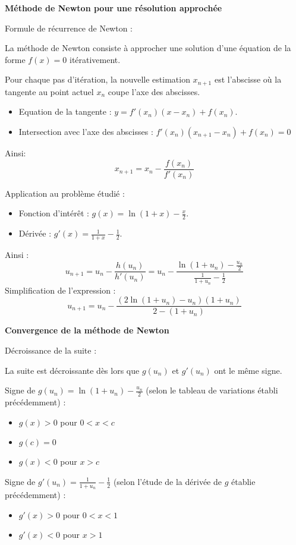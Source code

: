 \documentclass[10pt,a4paper]{article}
\begin{document}
\bigskip
\textbf{Méthode de Newton pour une résolution approchée}

\q Formule de récurrence de Newton :

La méthode de Newton consiste à approcher une solution d'une équation de la forme \( f(x) = 0 \) itérativement.

Pour chaque pas d'itération, la nouvelle estimation $x_{n+1}$ est l'abscisse où la tangente au point
actuel \( x_n \) coupe l'axe des abscisses.
\begin{itemize}
    \item Equation de la tangente : \( y = f'(x_n)(x - x_n) + f(x_n) \).
    \item Intersection avec l'axe des abscisses : \( f'(x_n)(x_{n+1} - x_n) + f(x_n) = 0 \)
\end{itemize}
Ainsi:
\[
x_{n+1} = x_n - \frac{f(x_n)}{f'(x_n)}
\]


\q Application au problème étudié :
\begin{itemize}
    \item Fonction d'intérêt : \( g(x) = \ln(1+x) - \frac{x}{2} \).
    \item Dérivée : \( g'(x) = \frac{1}{1+x} - \frac{1}{2} \).
\end{itemize}
Ainsi :
\[
 u_{n+1} = u_n - \frac{h(u_n)}{h'(u_n)} = u_n - \frac{\ln(1+u_n) - \frac{u_n}{2}}{\frac{1}{1+u_n} - \frac{1}{2}}
\]
Simplification de l'expression :
\[
 u_{n+1} = u_n - \frac{(2\ln(1+u_n) - u_n)(1+u_n)}{2 - (1+u_n)}
\]


\bigskip
\textbf{Convergence de la méthode de Newton}

\q Décroissance de la suite :

La suite est décroissante dès lors que \( g(u_n) \) et \( g'(u_n) \) ont le même signe.

Signe de \( g(u_n) = \ln(1+u_n) - \frac{u_n}{2} \) (selon le tableau de variations établi
précédemment) :
\begin{itemize}
    \item \( g(x) > 0 \) pour \( 0 < x < c \)
    \item \( g(c) = 0 \)
    \item \( g(x) < 0 \) pour \( x > c \)
\end{itemize}

Signe de \( g'(u_n) = \frac{1}{1+u_n} - \frac{1}{2} \) (selon l'étude de la dérivée de \( g \)
établie précédemment) :
\begin{itemize}
    \item \( g'(x) > 0 \) pour \( 0 < x < 1 \)
    \item \( g'(x) < 0 \) pour \( x > 1 \)
\end{itemize}
\end{document}
